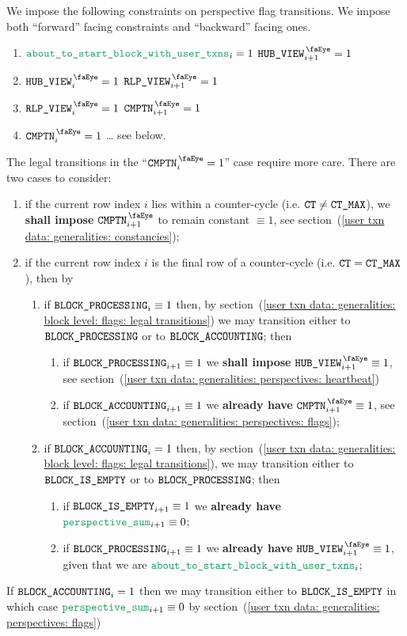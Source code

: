 We impose the following constraints on perspective flag transitions.
We impose both
``forward''  facing constraints and
``backward'' facing ones.
\begin{enumerate}
	\item \If $\aboutToStartBlockWithUserTransactions _{i} = 1$ \Then $\isUserTxnHubView _{i + 1} = 1$
	\item \If $\isUserTxnHubView     _{i} = 1$ \Then $\isUserTxnRlpView     _{i + 1} = 1$
	\item \If $\isUserTxnRlpView     _{i} = 1$ \Then $\isUserTxnComputation _{i + 1} = 1$
	\item \If $\isUserTxnComputation _{i} = 1$ \Then \dots{} see below.
\end{enumerate}
\saNote{}
The legal transitions in the ``$\isUserTxnComputation _{i} = 1$'' case require more care.
There are two cases to consider:
\begin{enumerate}
	\item
		if the current row index $i$ lies within a counter-cycle (i.e. $\texttt{CT} \neq \texttt{CT\_MAX}$),
		we \textbf{shall impose} $\isUserTxnComputation _{i + 1}$ to remain constant $\equiv 1$,
		see section~(\ref{user txn data: generalities: constancies});
	\item 
		if the current row index $i$ is the final row of a counter-cycle (i.e. $\texttt{CT} = \texttt{CT\_MAX}$), then by
		\begin{enumerate}
			\item 
				if $\texttt{BLOCK\_PROCESSING} _{i} \equiv 1$ then,
				by section~(\ref{user txn data: generalities: block level: flags: legal transitions})
				we may transition either to $\texttt{BLOCK\_PROCESSING}$ or to $\texttt{BLOCK\_ACCOUNTING}$;
				then
				\begin{enumerate}
					\item
						if $\texttt{BLOCK\_PROCESSING} _{i + 1} \equiv 1$ we \textbf{shall impose} $\isUserTxnHubView     _{i + 1} \equiv 1$,
						see section~(\ref{user txn data: generalities: perspectives: heartbeat})
					\item
						if $\texttt{BLOCK\_ACCOUNTING} _{i + 1} \equiv 1$ we \textbf{already have} $\isUserTxnComputation _{i + 1} \equiv 1$,
						see section~(\ref{user txn data: generalities: perspectives: flags});
				\end{enumerate}
			\item 
				if $\texttt{BLOCK\_ACCOUNTING} _{i} = 1$ then,
				by section~(\ref{user txn data: generalities: block level: flags: legal transitions}),
				we may transition either to $\texttt{BLOCK\_IS\_EMPTY}$ or to $\texttt{BLOCK\_PROCESSING}$;
				then
				\begin{enumerate}
					\item if $\texttt{BLOCK\_IS\_EMPTY}    _{i + 1} \equiv 1$ we \textbf{already have} $\perspectiveSum   _{i + 1} \equiv 0$;
					\item if $\texttt{BLOCK\_PROCESSING} _{i + 1} \equiv 1$ we \textbf{already have} $\isUserTxnHubView _{i + 1} \equiv 1$,
						given that we are $\aboutToStartBlockWithUserTransactions _{i}$;
				\end{enumerate}
		\end{enumerate}
\end{enumerate}
If $\texttt{BLOCK\_ACCOUNTING} _{i} = 1$ then we may transition either to $\texttt{BLOCK\_IS\_EMPTY}$ in which case $\perspectiveSum _{i + 1} \equiv 0$ by
section~(\ref{user txn data: generalities: perspectives: flags})
